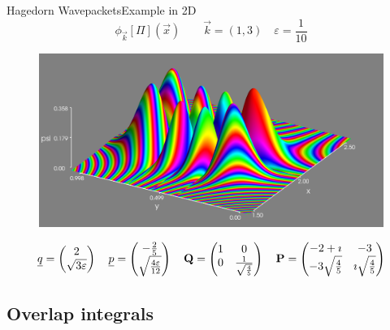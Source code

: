 \documentclass{beamer}
\begin{document}
\begin{frame}{Hagedorn Wavepackets}{Example in 2D}
  \vspace{-0.4cm}
  \scriptsize
  \begin{equation*}
    \phi_{\vec{k}}[\Pi](\vec{x}) \quad\quad \vec{k} = (1,3) \quad \varepsilon = \frac{1}{10}
  \end{equation*}
  \vspace{-0.4cm}
  \begin{figure}[h!]
    \centering
    \includegraphics[width=0.8\linewidth]{./fig/wavepackets_2d.png}
  \end{figure}
    \scriptsize
  \begin{equation*}
    \underline{q} =
    \begin{pmatrix}
      2 \\ \sqrt{3\varepsilon}
    \end{pmatrix}
    \quad
    \underline{p} =
    \begin{pmatrix}
      -\frac{2}{5} \\ \sqrt{\frac{4\varepsilon}{12}}
    \end{pmatrix}
    \quad
    \mathbf{Q} =
    \begin{pmatrix}
      1 & 0 \\
      0 & \frac{1}{\sqrt{\frac{4}{5}}}
    \end{pmatrix}
    \quad
    \mathbf{P} =
    \begin{pmatrix}
      -2+\imath & -3 \\
      -3\sqrt{\frac{4}{5}} & \imath\sqrt{\frac{4}{5}}
    \end{pmatrix}
  \end{equation*}
\end{frame}


\subsection{Overlap integrals}
\end{document}
